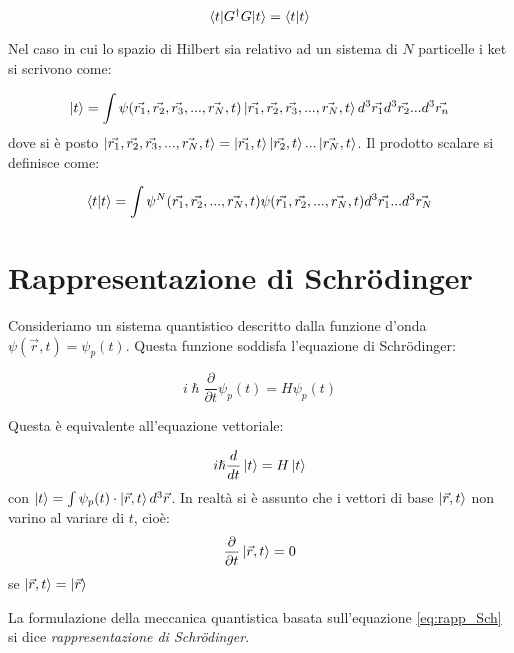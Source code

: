 \begin{equation}
\braket{t|G^{\dag}G|t}=\braket{t|t}
\end{equation}

Nel caso in cui lo spazio di Hilbert sia relativo ad un sistema di $N$ 
particelle i ket si scrivono come:

\begin{equation}
\ket{t}=\int\psi(\vec{r_1},\vec{r_2},\vec{r_3},...,\vec{r_N},t)\ket{\vec{r_1},
\vec{r_2},\vec{r_3},...,\vec{r_N},t}d^3\vec{r_1}d^3\vec{r_2}...d^3\vec{r_n}
\end{equation}
dove si è posto 
$\ket{\vec{r_1},\vec{r_2},\vec{r_3},...,\vec{r_N},t}=\ket{\vec{r_1},t}\ket{\vec{
r_2},t}...\ket{\vec{r_N},t}$.
Il prodotto scalare si definisce come:

\begin{equation}
\braket{t|t}=\int\psi^N(\vec{r_1},\vec{r_2},...,\vec{r_N},t)\psi(\vec{r_1},\vec{
r_2},...,\vec{r_N},t)d^3\vec{r_1}...d^3\vec{r_N}
\end{equation}


\section{Rappresentazione di Schr\"{o}dinger}
Consideriamo un sistema quantistico descritto dalla funzione d'onda
$\psi(\vec{r},t)=\psi_{p}(t)$. Questa funzione soddisfa l'equazione di
Schr\"{o}dinger:

\begin{equation}
i\hslash\frac{\partial}{\partial t}\psi_{p}(t)=H\psi_{p}(t)
\end{equation}

Questa è equivalente all'equazione vettoriale:

\begin{equation}
i\hslash\frac{d}{dt}\ket{t}=H\ket{t}
\label{eq:rapp_Sch}
\end{equation}
con $\ket{t}=\int\psi_{p}(t)\cdot \ket{\vec{r},t}d^{3}\vec{r}$.
In realtà si è assunto che i vettori di base $\ket{\vec{r},t}$ non varino al
variare di $t$, cioè:
\begin{equation}
\frac{\partial}{\partial t}\ket{\vec{r},t}=0 
\end{equation}
se $\ket{\vec{r},t}=\ket{\vec{r}}$

La formulazione della meccanica quantistica basata sull'equazione
\eqref{eq:rapp_Sch} si dice \textit{rappresentazione di Schr\"{o}dinger}.

